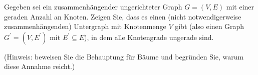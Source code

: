 
\begin{exercise}

Gegeben sei ein zusammenhängender ungerichteter Graph $G = (V, E)$ mit einer geraden Anzahl an Knoten.
Zeigen Sie, dass es einen (nicht notwendigerweise zusammenhängenden) Untergraph mit Knotenmenge $V$ gibt (also einen Graph $G^\prime = (V, E^\prime)$ mit $E^\prime \subseteq E$),  in dem alle Knotengrade ungerade sind.

(Hinweis: beweisen Sie die Behauptung für Bäume und begründen Sie, warum diese Annahme reicht.)

\end{exercise}



